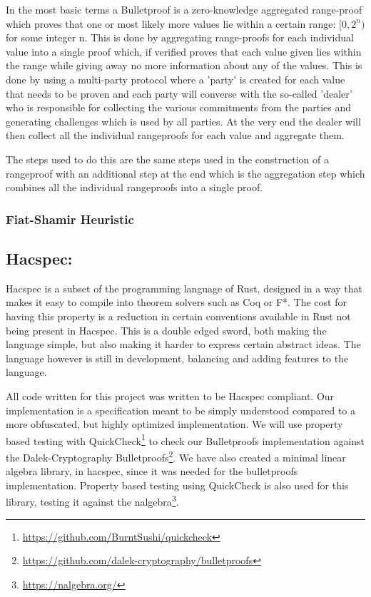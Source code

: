 \documentclass{article}
\begin{document}
In the most basic terms a Bulletproof is a zero-knowledge aggregated range-proof which proves that one or most likely more values lie within a certain range: $[0,2^n)$ for some integer n. This is done by aggregating range-proofs for each individual value into a single proof which, if verified proves that each value given lies within the range while giving away no more information about any of the values. This is done by using a multi-party protocol where a 'party' is created for each value that needs to be proven and each party will converse with the so-called 'dealer' who is responsible for collecting the various commitments from the parties and generating challenges which is used by all parties. At the very end the dealer will then collect all the individual rangeproofs for each value and aggregate them. 

The steps used to do this are the same steps used in the construction of a rangeproof with an additional step at the end which is the aggregation step which combines all the individual rangeproofs into a single proof.

\subsubsection{Fiat-Shamir Heuristic}\label{fiat-shamir-heuristic}

\subsection{Hacspec:} \label{Hacspec}

Hacspec is a subset of the programming language of Rust, designed in a
way that makes it easy to compile into theorem solvers such as Coq or F*.
The cost for having this property is a reduction in certain conventions
available in Rust not being present in Hacspec. This is a double edged
sword, both making the language simple, but also making it harder to
express certain abstract ideas. The language however is still in
development, balancing and adding features to the language.

All code written for this project was written to be Hacspec
compliant.  Our implementation is a specification meant to
be simply understood compared to a more obfuscated, but highly
optimized implementation. We will use property based testing with
QuickCheck\footnote{\url{https://github.com/BurntSushi/quickcheck}}
to check our Bulletproofs implementation against the Dalek-Cryptography
Bulletproofs\footnote{\url{https://github.com/dalek-cryptography/bulletproofs}}.
We have also created a minimal linear algebra library, in hacspec,
since it was needed for the bulletproofs implementation. Property
based testing using QuickCheck is also used for this library, testing
it against the nalgebra\footnote{\url{https://nalgebra.org/}}.
\end{document}

